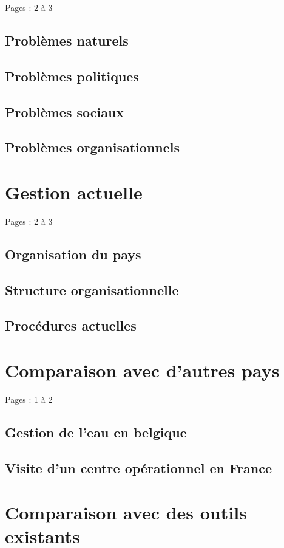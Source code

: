 \documentclass{eplmastersthesis_FR}
\begin{document}
			Pages : 2 à 3

			\subsection*{Problèmes naturels}
			\subsection*{Problèmes politiques}
			\subsection*{Problèmes sociaux}
			\subsection*{Problèmes organisationnels}

		\section{Gestion actuelle}

			Pages : 2 à 3

			\subsection*{Organisation du pays}
			\subsection*{Structure organisationnelle}
			\subsection*{Procédures actuelles}

		\section{Comparaison avec d'autres pays}

			Pages : 1 à 2

			\subsection*{Gestion de l'eau en belgique}
			\subsection*{Visite d'un centre opérationnel en France}

		\section{Comparaison avec des outils existants}
\end{document}
